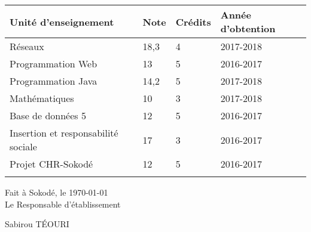 \documentclass[a4paper,10pt]{article}
\begin{document}
\vspace{1cm}
\begin{center}
\begin{tabular}{|>{\raggedright}p{9cm}|P{1.1cm}|P{1.6cm}|P{2.4cm}|}
	\hline
	\textbf{Unité d'enseignement} & \textbf{Note} & \textbf{Crédits} & \textbf{Année d'obtention}\\
	\hline
Réseaux & 18,3 & 4 & 2017-2018\\
\hline
Programmation Web & 13 & 5 & 2016-2017\\
\hline
Programmation Java & 14,2 & 5 & 2017-2018\\
\hline
Mathématiques & 10 &   3 & 2017-2018\\
\hline
Base de données 5 & 12 &   5 & 2016-2017\\
\hline
Insertion et responsabilité sociale & 17 & 3 & 2016-2017\\
\hline
Projet CHR-Sokodé & 12 & 5 & 2016-2017\\
\hline
{} & \textbf{} & \\
\end{tabular}
\end{center}
\vspace{1cm}
\null\hfill Fait à Sokodé, le \today\\
\null\hfill Le Responsable d'établissement\\


\vspace{2cm}

\null\hfill Sabirou TÉOURI

\vfill

\newpage
{}
\end{document}
